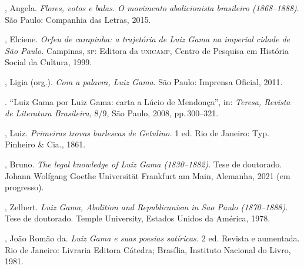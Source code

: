 \begin{bibliohedra}
, Angela. \emph{Flores, votos e balas. O movimento abolicionista
brasileiro (1868--1888)}. São Paulo: Companhia das Letras, 2015.

, Elciene. \emph{Orfeu de carapinha: a trajetória de Luiz Gama na
imperial cidade de São Paulo.} Campinas, \textsc{sp}: Editora da \textsc{unicamp}, Centro
de Pesquisa em História Social da Cultura, 1999.

, Ligia (org.). \emph{Com a palavra, Luiz Gama}. São Paulo:
Imprensa Oficial, 2011.

\titidem. ``Luiz Gama por Luiz Gama: carta
a Lúcio de Mendonça'', in: \emph{Teresa, Revista de Literatura
Brasileira,} 8/9, São Paulo, 2008, pp.\,300--321.

, Luiz. \emph{Primeiras trovas burlescas de Getulino.} 1 ed. Rio de
Janeiro: Typ. Pinheiro \& Cia., 1861.

, Bruno. \emph{The legal knowledge of Luiz Gama (1830--1882)}. Tese
de doutorado. Johann Wolfgang Goethe Universität Frankfurt am Main,
Alemanha, 2021 (em progresso).

, Zelbert. \emph{Luiz Gama, Abolition and Republicanism in Sao
Paulo (1870--1888)}. Tese de doutorado. Temple University, Estados Unidos
da América, 1978.

, João Romão da. \emph{Luiz Gama e suas poesias satíricas.} 2 ed.
Revista e aumentada. Rio de Janeiro: Livraria Editora Cátedra; Brasília,
Instituto Nacional do Livro, 1981.
\end{bibliohedra}

